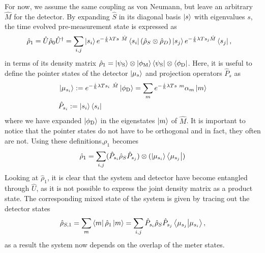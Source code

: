 \documentclass{article}
\begin{document}
For now, we assume the same coupling as von Neumann, but leave an arbitrary $\hat{M}$ for the detector. By expanding
$\hat{S}$ in its diagonal basis $\ket{s}$ with eigenvalues $s$, the time evolved pre-measurement state is expressed as
\begin{align*}
  \hat{\rho}_1 = \hat{U}\hat{\rho}_0 \hat{U}^\dagger & =  \sum_{i,j} \ket{s_i} e^{-\frac{i}{\hbar} \lambda T s \hat{M} } \bra{s_i}
  \left (  \hat{\rho}_S \otimes \hat{\rho}_D \right ) \ket{s_j} e^{-\frac{i}{\hbar} \lambda 
    T s_j\hat{M} } \bra{s_j},
\end{align*}
in terms of its density matrix 
$\hat{\rho}_1 = \ket{\psi_{\text S}} \otimes \ket{\phi_{\rm M}}\bra{\psi_{\text S}} \otimes \bra{\phi_{\rm D}}$.
Here, it is useful to define the pointer states of the detector 
$\ket{\mu_s}$ and projection operators $\hat{P}_s$ as
\begin{align}
    & \ket{\mu_{s_i}} := e^{-\frac{i}{\hbar} \lambda T s_i \hat{M} } \ket{\phi_{\rm D}} = \sum_m  e^{-\frac{i}{\hbar} \lambda T s m } 
    \alpha_m \ket{m} \\
    & \hat{P}_{s_i} := \ket{s_i} \bra{s_i}
\end{align}
where we have expanded $\ket{\phi_{\rm D}}$ in the eigenstates $\ket{m}$ of $\hat{M}$. It is important to notice that the pointer states do not have to
be orthogonal and in fact, they often are not. Using these definitions,$\rho_1$ becomes
\begin{align}\label{eq:pre_measurement}
    \hat{\rho}_1 = \sum_{i,j} ( \hat{P}_{s_i} \hat{\rho}_S \hat{P}_{s_j} ) \otimes 
    (\ket{\mu_{s_i}}\bra{\mu_{{s_j}}})
\end{align}
Looking at $\hat{\rho}_1$, it is clear that the system and detector have become entangled through $\hat{U}$, as
it is not possible to express the joint density matrix as a product state. The corresponding mixed state of the system
is given by tracing out the detector states
\begin{align}\label{eq:pre_measurement_system_full}
    \hat{\rho}_{S,1} =  \sum_m \bra{m}\hat{\rho}_{1}\ket{m} = \sum_{i,j} \hat{P}_{s_i} \hat{\rho}_{S} \hat{P}_{s_j}
    \bra{\mu_{s_j}} \ket{\mu_{s_i}},
\end{align}
as a result the system now depends on the overlap of the meter states. 
\end{document}
